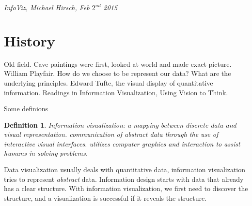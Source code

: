 \documentclass[]{article}
\newtheorem{mydef}{Definition}[section]
\begin{document}
\begin{flushright}
	\textit{InfoViz, Michael Hirsch, Feb $2^{nd}$ 2015}
\end{flushright}

\section{History}
Old field. Cave paintings were first, looked at world and made exact picture. William Playfair. How do we choose to be represent our data? What are the underlying principles. Edward Tufte, the visual display of quantitative information. Readings in Information Visualization, Using Vision to Think.

Some definions

\begin{mydef}
Information visualization: a mapping between discrete data and visual representation. communication of abstract data through the use of interactive visual interfaces. utilizes computer graphics and interaction to assist humans in solving problems.
\end{mydef}

Data visualization usually deals with quantitative data, information visualization tries to represent \textit{abstract} data. Information design starts with data that already has a clear structure. With information visualization, we first need to discover the structure, and a visualization is successful if it reveals the structure. 
\end{document}
